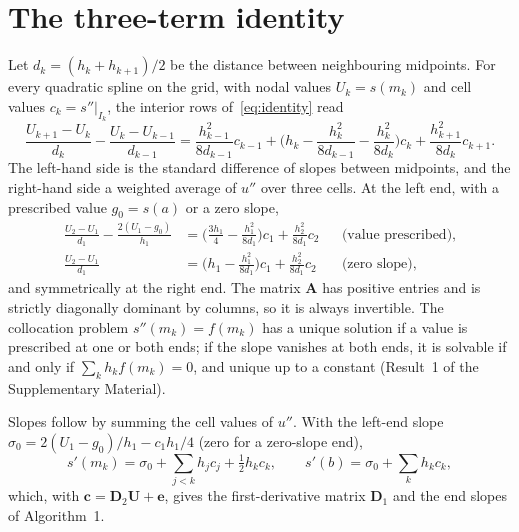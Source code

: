 \documentclass[preprint,12pt]{elsarticle}
\theoremstyle{remark}
\begin{document}
\section{The three-term identity}\label{app:identity}
Let $d_k=(h_k+h_{k+1})/2$ be the distance between neighbouring midpoints. For every quadratic spline on the
grid, with nodal values $U_k=s(m_k)$ and cell values $c_k=s''|_{I_k}$, the interior rows of~\eqref{eq:identity}
read
\begin{equation}\label{eq:interior}
\frac{U_{k+1}-U_k}{d_k}-\frac{U_k-U_{k-1}}{d_{k-1}}
=\frac{h_{k-1}^2}{8d_{k-1}}c_{k-1}+\Big(h_k-\frac{h_k^2}{8d_{k-1}}-\frac{h_k^2}{8d_k}\Big)c_k+\frac{h_{k+1}^2}{8d_k}c_{k+1}.
\end{equation}
The left-hand side is the standard difference of slopes between midpoints, and the right-hand side a
weighted average of $u''$ over three cells. At the left end, with a prescribed value $g_0=s(a)$ or a zero
slope,
\begin{align}
\frac{U_2-U_1}{d_1}-\frac{2(U_1-g_0)}{h_1}&=\Big(\frac{3h_1}{4}-\frac{h_1^2}{8d_1}\Big)c_1+\frac{h_2^2}{8d_1}c_2 &&\text{(value prescribed)},\label{eq:dirrow}\\
\frac{U_2-U_1}{d_1}&=\Big(h_1-\frac{h_1^2}{8d_1}\Big)c_1+\frac{h_2^2}{8d_1}c_2 &&\text{(zero slope)},\label{eq:neurow}
\end{align}
and symmetrically at the right end. The matrix $\mathbf A$ has positive entries and is strictly diagonally dominant
by columns, so it is always invertible. The collocation problem $s''(m_k)=f(m_k)$ has a unique solution if a
value is prescribed at one or both ends; if the slope vanishes at both ends, it is solvable if and only if
$\sum_kh_kf(m_k)=0$, and unique up to a constant (Result~1 of the Supplementary Material).

Slopes follow by summing the cell values of $u''$. With the left-end slope
$\sigma_0=2(U_1-g_0)/h_1-c_1h_1/4$ (zero for a zero-slope end),
\begin{equation}\label{eq:D1}
s'(m_k)=\sigma_0+\sum_{j<k}h_jc_j+\tfrac12h_kc_k,\qquad s'(b)=\sigma_0+\sum_kh_kc_k,
\end{equation}
which, with $\mathbf c=\mathbf D_2\mathbf U+\mathbf e$, gives the first-derivative matrix $\mathbf D_1$ and the end slopes of Algorithm~1.

\end{document}
